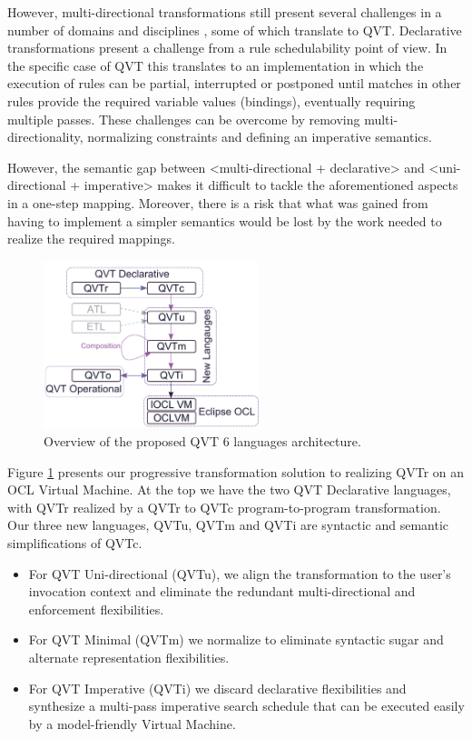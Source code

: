 However, multi-directional transformations still present several challenges in a number of domains and disciplines \cite{Czarnecki.etal2009}, some of which translate to QVT\cite{Stevens2010}. Declarative transformations present a challenge from a rule schedulability point of view. In the specific case of QVT this translates to an implementation in which the execution of rules can be partial, interrupted or postponed until matches in other rules provide the required variable values (bindings), eventually requiring multiple passes. These challenges can be overcome by removing multi-directionality, normalizing constraints and defining an imperative semantics. 

However, the semantic gap between \textless multi-directional + declarative\textgreater\hspace{0pt} and \textless uni-directional + imperative\textgreater\hspace{0pt} makes it difficult to tackle the aforementioned aspects in a one-step mapping. Moreover, there is a risk that what was gained from having to implement a simpler semantics would be lost by the work needed to realize the required mappings.

\begin{figure}[h]
	\centering
	\includegraphics[width=0.56\textwidth]{QVTView.pdf}
	\caption{Overview of the proposed QVT 6 languages architecture.}
	\label{fig:overview}
\end{figure}

Figure \ref{fig:overview} presents our progressive transformation solution to realizing QVTr on an OCL Virtual Machine\cite{Willink2012}. At the top we have the two QVT Declarative languages, with QVTr realized by a QVTr to QVTc program-to-program transformation. Our three new languages, QVTu, QVTm and QVTi are syntactic and semantic simplifications of QVTc.

\begin{itemize}
\item For QVT Uni-directional (QVTu), we align the transformation to the user's invocation context and eliminate the redundant multi-directional and enforcement flexibilities.
\item For QVT Minimal (QVTm) we normalize to eliminate syntactic sugar and alternate representation flexibilities.
\item For QVT Imperative (QVTi) we discard declarative flexibilities and synthesize a multi-pass imperative search schedule that can be executed easily by a model-friendly Virtual Machine.
\end{itemize}

